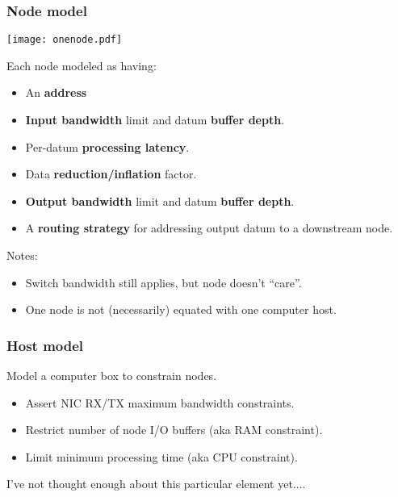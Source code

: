 \documentclass[xcolor=dvipsnames]{beamer}
\begin{document}
\begin{frame}
  \frametitle{Node model}


  \begin{center}
  \vspace{-10mm}
  \texttt{[image: onenode.pdf]}    
  \vspace{-15mm}
  \end{center}

  Each node modeled as having:
  \begin{itemize}\footnotesize
  \item An \textbf{address}
  \item \textbf{Input bandwidth} limit and datum \textbf{buffer depth}.
  \item Per-datum \textbf{processing latency}.
  \item Data \textbf{reduction/inflation} factor.
  \item \textbf{Output bandwidth} limit and datum \textbf{buffer depth}.
  \item A \textbf{routing strategy} for addressing output datum to a downstream node.
  \end{itemize}

  \footnotesize
  Notes:
  \begin{itemize}
  \item Switch bandwidth still applies, but node doesn't ``care''.
  \item One node is not (necessarily) equated with one computer host.
  \end{itemize}

\end{frame}

\begin{frame}
  \frametitle{Host model}
  Model a computer box to constrain nodes.
  \begin{itemize}
  \item Assert NIC RX/TX maximum bandwidth constraints.
  \item Restrict number of node I/O buffers (aka RAM constraint).
  \item Limit minimum processing time (aka CPU constraint).
  \end{itemize}

  \vfill
  \footnotesize

  I've not thought enough about this particular element yet....

\end{frame}
\end{document}
